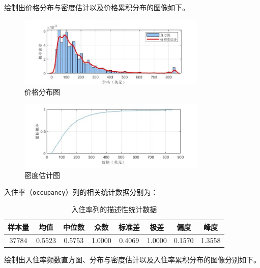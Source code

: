 \documentclass[12pt]{article}
\begin{document}
\begin{CJK}{UTF8}{gbsn}
	绘制出价格分布与密度估计以及价格累积分布的图像如下。
	
	\begin{figure}[H]
		\centering
		\includegraphics[width=0.8\textwidth]{pic/41.jpg} %
		\caption{价格分布图}
		\label{fig:41}
	\end{figure}
	
	\begin{figure}[H]
		\centering
		\includegraphics[width=0.8\textwidth]{pic/42.jpg} %
		\caption{密度估计图}
		\label{fig:42}
	\end{figure}
	
	入住率（\texttt{occupancy}）列的相关统计数据分别为：
	
	\begin{table}[H] %
		\centering
		\begin{tabular}{cccccccc}
			\toprule
			样本量 & 均值 & 中位数 & 众数 & 标准差 & 极差 & 偏度 & 峰度 \\
			\midrule
			37784 & 0.5523 & 0.5753 & 1.0000 & 0.4069 & 1.0000 & 0.1570 & 1.3558 \\
			\bottomrule
		\end{tabular}
		\caption{入住率列的描述性统计数据}
	\end{table}
	
	绘制出入住率频数直方图、分布与密度估计以及入住率累积分布的图像分别如下。
	

\end{CJK}
\end{document}
